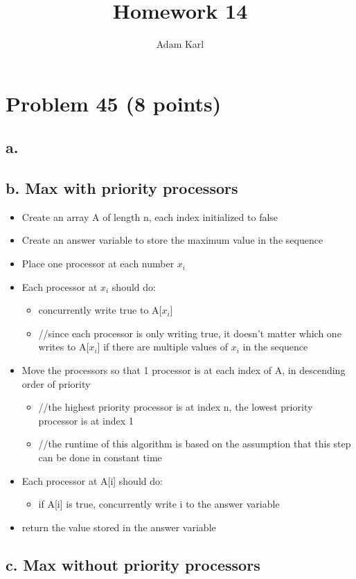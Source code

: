 \documentclass[a4paper]{article}
\title{Homework 14}
\author{Adam Karl}
\begin{document}
\maketitle

\section{Problem 45 (8 points)}
\subsection{a.}


\subsection{b. Max with priority processors}
\begin{itemize}
    \item Create an array A of length n, each index initialized to false
    \item Create an answer variable to store the maximum value in the sequence
    \item Place one processor at each number $x_i$
    \item Each processor at $x_i$ should do:
    \begin{itemize}
        \item concurrently write true to A[$x_i$]
        \item //since each processor is only writing true, it doesn't matter which one writes to A[$x_i$] if there are multiple values of $x_i$ in the sequence
    \end{itemize}
    \item Move the processors so that 1 processor is at each index of A, in descending order of priority
    \begin{itemize}
        \item //the highest priority processor is at index n, the lowest priority processor is at index 1
        \item //the runtime of this algorithm is based on the assumption that this step can be done in constant time
    \end{itemize}
    \item Each processor at A[i] should do:
    \begin{itemize}
        \item if A[i] is true, concurrently write i to the answer variable
    \end{itemize}
    \item return the value stored in the answer variable
    
\end{itemize}


\subsection{c. Max without priority processors}
\end{document}
